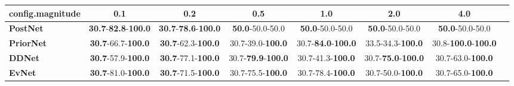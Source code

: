 \begin{tabular}{lccccccc}
\toprule
\textbf{config.magnitude} &                                         0.1 &                                         0.2 &                                0.5 &                                1.0 &                                2.0 &                                 4.0 \\
\midrule
\textbf{PostNet } &  \textbf{30.7}-\textbf{82.8}-\textbf{100.0} &  \textbf{30.7}-\textbf{78.6}-\textbf{100.0} &            \textbf{50.0}-50.0-50.0 &            \textbf{50.0}-50.0-50.0 &            \textbf{50.0}-50.0-50.0 &             \textbf{50.0}-50.0-50.0 \\
\textbf{PriorNet} &           \textbf{30.7}-66.7-\textbf{100.0} &           \textbf{30.7}-62.3-\textbf{100.0} &           30.7-39.0-\textbf{100.0} &  30.7-\textbf{84.0}-\textbf{100.0} &           33.5-34.3-\textbf{100.0} &  30.8-\textbf{100.0}-\textbf{100.0} \\
\textbf{DDNet   } &           \textbf{30.7}-57.9-\textbf{100.0} &           \textbf{30.7}-77.1-\textbf{100.0} &  30.7-\textbf{79.9}-\textbf{100.0} &           30.7-41.3-\textbf{100.0} &  30.7-\textbf{75.0}-\textbf{100.0} &            30.7-63.0-\textbf{100.0} \\
\textbf{EvNet   } &           \textbf{30.7}-81.0-\textbf{100.0} &           \textbf{30.7}-71.5-\textbf{100.0} &           30.7-75.5-\textbf{100.0} &           30.7-78.4-\textbf{100.0} &           30.7-50.0-\textbf{100.0} &            30.7-65.0-\textbf{100.0} \\
\bottomrule
\end{tabular}
